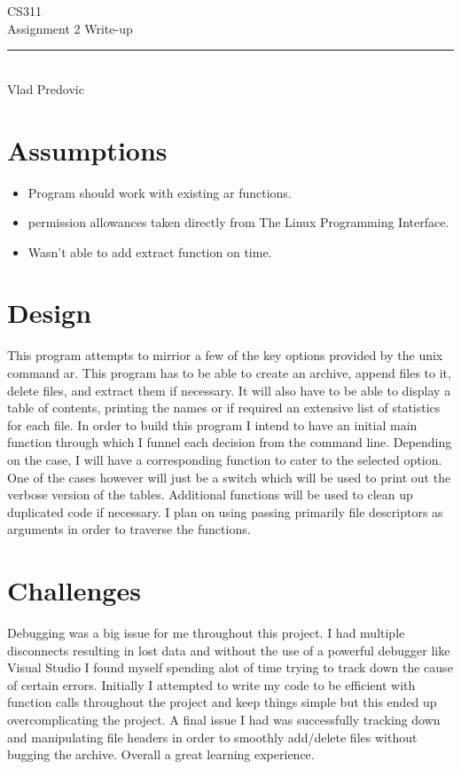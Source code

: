 \documentclass[letterpaper,10pt]{article}
\begin{document}
\begin{titlepage}
    \vspace*{4cm}
    \begin{flushleft}
    {\huge
        CS311\\[.5cm]
    }
    {\large
        Assignment 2 Write-up
    }
    \end{flushleft}
    \vfill
    \rule{5in}{.5mm}\\
    Vlad Predovic

\end{titlepage}

\section{Assumptions}
\begin{itemize}
\item Program should work with existing ar functions.
\item permission allowances taken directly from The Linux Programming Interface.
\item Wasn't able to add extract function on time.
\end{itemize}

\section{Design}

This program attempts to mirrior a few of the key options provided by the unix command ar. This program has to be able to create an archive, append files to it, delete files, and extract them if necessary. It 
will also have to be able to display a table of contents, printing the names or if required an extensive list of statistics for each file.
In order to build this program I intend to have an initial main function through which I funnel each decision from the command line. Depending on the case, I will have a corresponding function to cater to
the selected option. One of the cases however will just be a switch which will be used to print out the verbose version of the tables. Additional functions will be used to clean up duplicated code
if necessary. I plan on using passing primarily file descriptors as arguments in order to traverse the functions.




\section{Challenges}
Debugging was a big issue for me throughout this project. I had multiple disconnects resulting in lost data and without the use of a powerful debugger like Visual Studio I found myself spending alot of 
time trying to track down the cause of certain errors. Initially I attempted to write my code to be efficient with function calls throughout the project and keep things simple but this ended up overcomplicating the
project. A final issue I had was successfully tracking down and manipulating file headers in order to smoothly add/delete files without bugging the archive.
Overall a great learning experience.
\end{document}
